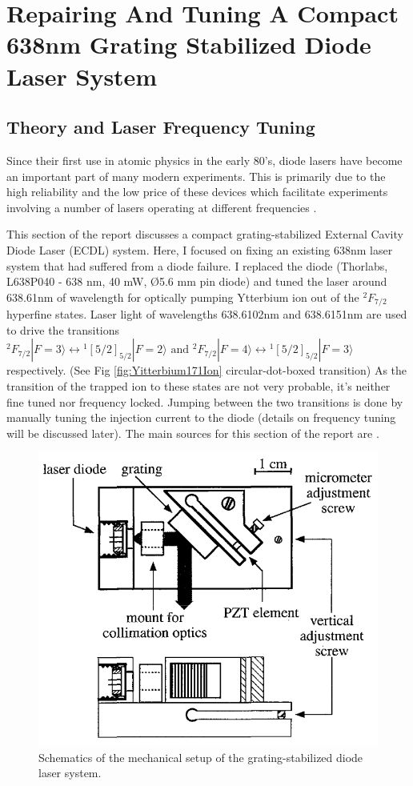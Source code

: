 \documentclass[12pt]{report}
\begin{document}
\chapter{Repairing And Tuning A Compact 638nm Grating Stabilized Diode Laser System}
\section{Theory and Laser Frequency Tuning}
Since their first use in atomic physics in the early 80's, diode lasers have become an important part of many modern experiments. This is primarily due to the high reliability and the low price of these devices which facilitate experiments involving a number of lasers operating at different frequencies \cite{compactGratingDiodeLaser}.
\par
This section of the report discusses a compact grating-stabilized External Cavity Diode Laser (ECDL) system. Here, I focused on fixing an existing 638nm laser system that had suffered from a diode failure. I replaced the diode (Thorlabs, L638P040 - 638 nm, 40 mW, Ø5.6 mm pin diode) and tuned the laser around 638.61nm of wavelength for optically pumping Ytterbium ion out of the ${ }^2 F_{7 / 2}$ hyperfine states. Laser light of wavelengths 638.6102nm and 638.6151nm are used to drive the transitions ${ }^2 F_{7 / 2}|F=3\rangle \leftrightarrow{ }^1[5 / 2]_{5 / 2}|F=2\rangle \text { and }{ }^2 F_{7 / 2}|F=4\rangle \leftrightarrow{ }^1[5 / 2]_{5 / 2}|F=3\rangle$ respectively. (See Fig \ref{fig:Yitterbium171Ion} circular-dot-boxed transition) As the transition of the trapped ion to these states are not very probable, it's neither fine tuned nor frequency locked. Jumping between the two transitions is done by manually tuning the injection current to the diode (details on frequency tuning will be discussed later). The main sources for this section of the report are \cite{compactGratingDiodeLaser}\cite{fundamentalsOfPhotonics}.

\begin{figure}[H]
    \centering
    \includegraphics[width=.8\textwidth]{compactDiodeLaserSchematics.png}
    \caption{Schematics of the mechanical setup of the grating-stabilized diode laser system. \cite{compactGratingDiodeLaser}
    }
    \label{fig:compactDiodeLaserSchematics}
\end{figure}
\end{document}

